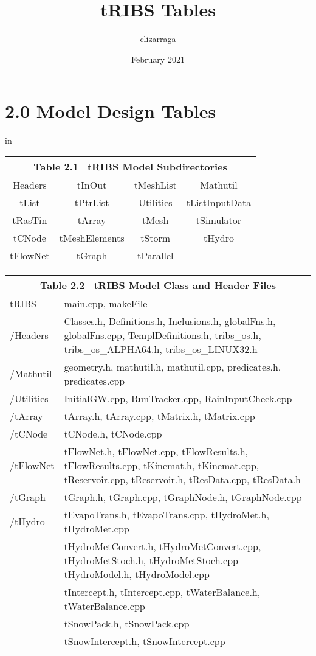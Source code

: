 \documentclass[12pt]{article}
\title{tRIBS Tables}
\author{clizarraga }
\date{February 2021}
\begin{document}
\maketitle

\renewcommand{\arraystretch}{1.1}

\section*{2.0 Model Design Tables}
 in

\begin{tabular}{cccc}
\multicolumn{4}{c}{\textbf{ Table 2.1} \,  tRIBS Model Subdirectories} \\ \hline
Headers & tInOut & tMeshList & Mathutil \\
tList & tPtrList & Utilities & tListInputData \\
tRasTin & tArray & tMesh & tSimulator \\
tCNode & tMeshElements & tStorm & tHydro \\
tFlowNet & tGraph & tParallel &   \\
\end{tabular}






\begin{tabular}{p{3cm} p{10cm}}
\multicolumn{2}{c}{\textbf{ Table 2.2} \,  tRIBS Model Class and Header Files} \\ \hline
tRIBS & main.cpp, makeFile \\
/Headers &  Classes.h, Definitions.h, Inclusions.h, globalFns.h, globalFns.cpp, TemplDefinitions.h, 
tribs{\_}os.h, tribs{\_}os{\_}ALPHA64.h, tribs{\_}os{\_}LINUX32.h 
\\
/Mathutil & geometry.h, mathutil.h, mathutil.cpp, predicates.h, predicates.cpp \\
/Utilities & InitialGW.cpp, RunTracker.cpp, RainInputCheck.cpp \\
/tArray & tArray.h, tArray.cpp, tMatrix.h, tMatrix.cpp \\
/tCNode & tCNode.h, tCNode.cpp \\
/tFlowNet & tFlowNet.h, tFlowNet.cpp, tFlowResults.h, tFlowResults.cpp, tKinemat.h, tKinemat.cpp, tReservoir.cpp, tReservoir.h, tResData.cpp, tResData.h \\
/tGraph & tGraph.h, tGraph.cpp, tGraphNode.h, tGraphNode.cpp \\
/tHydro & tEvapoTrans.h, tEvapoTrans.cpp, tHydroMet.h, tHydroMet.cpp \\
              & tHydroMetConvert.h, tHydroMetConvert.cpp, tHydroMetStoch.h, tHydroMetStoch.cpp tHydroModel.h, tHydroModel.cpp \\
              & tIntercept.h, tIntercept.cpp, tWaterBalance.h, tWaterBalance.cpp \\
              & tSnowPack.h, tSnowPack.cpp \\
              & tSnowIntercept.h, tSnowIntercept.cpp \\
\end{tabular}
\end{document}
